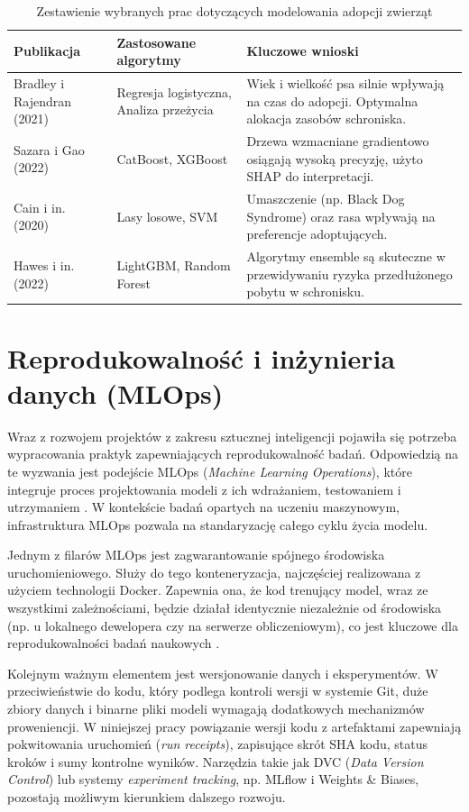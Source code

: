 \begin{table}[htbp]
\centering
\caption{Zestawienie wybranych prac dotyczących modelowania adopcji zwierząt}
\label{tab:related_works}
\begin{tabular}{|p{3.5cm}|p{3.5cm}|p{7cm}|}
\hline
\textbf{Publikacja} & \textbf{Zastosowane algorytmy} & \textbf{Kluczowe wnioski} \\ \hline
Bradley i Rajendran (2021) \cite{Bradley2021} & Regresja logistyczna, Analiza przeżycia & Wiek i wielkość psa silnie wpływają na czas do adopcji. Optymalna alokacja zasobów schroniska. \\ \hline
Sazara i Gao (2022) \cite{Sazara2022} & CatBoost, XGBoost & Drzewa wzmacniane gradientowo osiągają wysoką precyzję, użyto SHAP do interpretacji. \\ \hline
Cain i in. (2020) \cite{Cain2020} & Lasy losowe, SVM & Umaszczenie (np. Black Dog Syndrome) oraz rasa wpływają na preferencje adoptujących. \\ \hline
Hawes i in. (2022) \cite{Hawes2022} & LightGBM, Random Forest & Algorytmy ensemble są skuteczne w przewidywaniu ryzyka przedłużonego pobytu w schronisku. \\ \hline
\end{tabular}
\end{table}

\section{Reprodukowalność i inżynieria danych (MLOps)}

Wraz z rozwojem projektów z zakresu sztucznej inteligencji pojawiła się potrzeba wypracowania praktyk zapewniających reprodukowalność badań. Odpowiedzią na te wyzwania jest podejście MLOps (\textit{Machine Learning Operations}), które integruje proces projektowania modeli z ich wdrażaniem, testowaniem i utrzymaniem \cite{Sculley2015}. W kontekście badań opartych na uczeniu maszynowym, infrastruktura MLOps pozwala na standaryzację całego cyklu życia modelu.

Jednym z filarów MLOps jest zagwarantowanie spójnego środowiska uruchomieniowego. Służy do tego konteneryzacja, najczęściej realizowana z użyciem technologii Docker. Zapewnia ona, że kod trenujący model, wraz ze wszystkimi zależnościami, będzie działał identycznie niezależnie od środowiska (np. u lokalnego dewelopera czy na serwerze obliczeniowym), co jest kluczowe dla reprodukowalności badań naukowych \cite{Merkel2014}. 

Kolejnym ważnym elementem jest wersjonowanie danych i eksperymentów. W przeciwieństwie do kodu, który podlega kontroli wersji w systemie Git, duże zbiory danych i binarne pliki modeli wymagają dodatkowych mechanizmów proweniencji. W niniejszej pracy powiązanie wersji kodu z artefaktami zapewniają pokwitowania uruchomień (\emph{run receipts}), zapisujące skrót SHA kodu, status kroków i sumy kontrolne wyników. Narzędzia takie jak DVC (\textit{Data Version Control}) \cite{Kuprieiev2024} lub systemy \emph{experiment tracking}, np. MLflow i Weights \& Biases, pozostają możliwym kierunkiem dalszego rozwoju.

